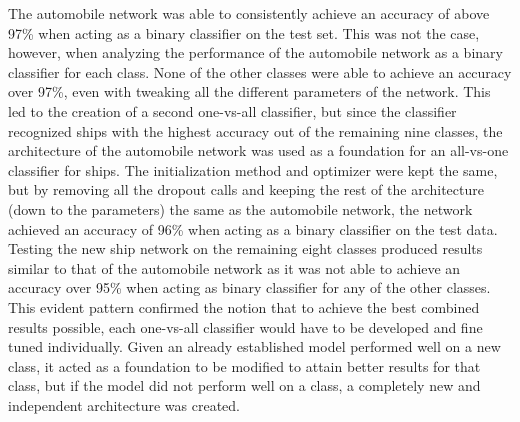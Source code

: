 \documentclass[10pt,twocolumn,letterpaper]{article}
\begin{document}
The automobile network was able to consistently achieve an accuracy of above 97\% when acting as a binary classifier on the test set. This was not the case, however, when analyzing the performance of the automobile network as a binary classifier for each class. None of the other classes were able to achieve an accuracy over 97\%, even with tweaking all the different parameters of the network. This led to the creation of a second one-vs-all classifier, but since the classifier recognized ships with the highest accuracy out of the remaining nine classes, the architecture of the automobile network was used as a foundation for an all-vs-one classifier for ships. The initialization method and optimizer were kept the same, but by removing all the dropout calls and keeping the rest of the architecture (down to the parameters) the same as the automobile network, the network achieved an accuracy of 96\% when acting as a binary classifier on the test data. Testing the new ship network on the remaining eight classes produced results similar to that of the automobile network as it was not able to achieve an accuracy over 95\% when acting as binary classifier for any of the other classes. This evident pattern confirmed the notion that to achieve the best combined results possible, each one-vs-all classifier would have to be developed and fine tuned individually. Given an already established model performed well on a new class, it acted as a foundation to be modified to attain better results for that class, but if the model did not perform well on a class, a completely new and independent architecture was created.
\end{document}
